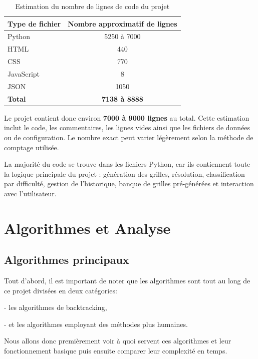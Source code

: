 \documentclass[a4paper]{article}
\begin{document}
\begin{table}[h]
    \centering
    \begin{tabular}{|l|c|}
        \hline
        \textbf{Type de fichier} & \textbf{Nombre approximatif de lignes} \\
        \hline
        Python & 5250 à 7000 \\
        \hline
        HTML & 440 \\
        \hline
        CSS & 770 \\
        \hline
        JavaScript & 8 \\
        \hline
        JSON & 1050 \\
        \hline
        \textbf{Total} & \textbf{7138 à 8888} \\
        \hline
    \end{tabular}
    \caption{Estimation du nombre de lignes de code du projet}
    \label{tab:stats-lignes}
\end{table}

Le projet contient donc environ \textbf{7000 à 9000 lignes} au total. Cette estimation inclut le code, les commentaires, les lignes vides ainsi que les fichiers de données ou de configuration. Le nombre exact peut varier légèrement selon la méthode de comptage utilisée.

La majorité du code se trouve dans les fichiers Python, car ils contiennent toute la logique principale du projet : génération des grilles, résolution, classification par difficulté, gestion de l'historique, banque de grilles pré-générées et interaction avec l'utilisateur.

\section{Algorithmes et Analyse}

\subsection{Algorithmes principaux}

Tout d'abord, il est important de noter que les algorithmes sont tout au long de ce projet divisées en deux catégories:

- les algorithmes de backtracking,

- et les algorithmes employant des méthodes plus humaines.

Nous allons donc premièrement voir à quoi servent ces algorithmes et leur fonctionnement basique puis ensuite comparer leur complexité en temps.
\end{document}
